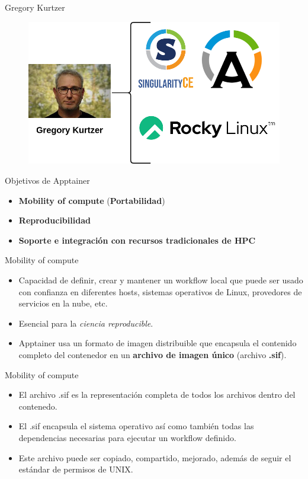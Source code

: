 \documentclass[11pt]{beamer}
\begin{document}
\begin{frame}{Gregory Kurtzer}
  \begin{figure}
  	\includegraphics[scale=0.4]{images/kurtzer}
  \end{figure}
\end{frame}

\begin{frame}{Objetivos de Apptainer \citep{kurtzer2017singularity}}
  \begin{itemize}
  	\item \textbf{Mobility of compute} (\textbf{Portabilidad})
  	\item \textbf{Reproducibilidad}
  	\item \textbf{Soporte e integración con recursos tradicionales de HPC}
  \end{itemize}
\end{frame}


\begin{frame}{Mobility of compute}
  \begin{itemize}
  	\item Capacidad de definir, crear y mantener un workflow local que puede ser usado con confianza en diferentes hosts, sistemas operativos de Linux, provedores de servicios en la nube, etc.
  	\item Esencial para la \textit{ciencia reproducible}.
  	\item Apptainer usa un formato de imagen distribuible que encapsula el contenido completo del contenedor en un \textbf{archivo de imagen único} (archivo \textbf{.sif}).

  \end{itemize}
\end{frame}

\begin{frame}{Mobility of compute}
  \begin{itemize}
 	\item El archivo .sif es la representación completa de todos los archivos dentro del contenedo.
 	\item El .sif encapsula el sistema operativo así como también todas las dependencias necesarias para ejecutar un workflow definido.
  	\item Este archivo puede ser copiado, compartido, mejorado, además de seguir el estándar de permisos de UNIX.
  \end{itemize}
\end{frame}
\end{document}
